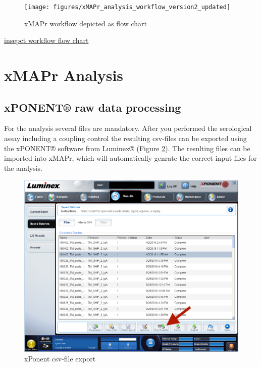\documentclass[
]{book}
\begin{document}
\begin{figure}

{\centering \texttt{[image: figures/xMAPr\_analysis\_workflow\_version2\_updated]} 

}

\caption{xMAPr workflow depicted as flow chart}\label{fig:xMAPrWorkflow}
\end{figure}

\href{figures/xMAPr_analysis_workflow_version2_updated.png}{insepct workflow flow chart}

\section{xMAPr Analysis}\label{xmapr-analysis}

\subsection{xPONENT® raw data processing}\label{xponent-raw-data-processing}

For the analysis several files are mandatory. After you performed the serological assay including a coupling control the resulting csv-files can be exported using the xPONENT® software from Luminex® (Figure \ref{fig:xPonentCSVexport}). The resulting files can be imported into xMAPr, which will automatically genrate the correct input files for the analysis.

\begin{figure}

{\centering \includegraphics[width=17.81in]{figures/xPonent_export} 

}

\caption{xPonent csv-file export}\label{fig:xPonentCSVexport}
\end{figure}
\end{document}
